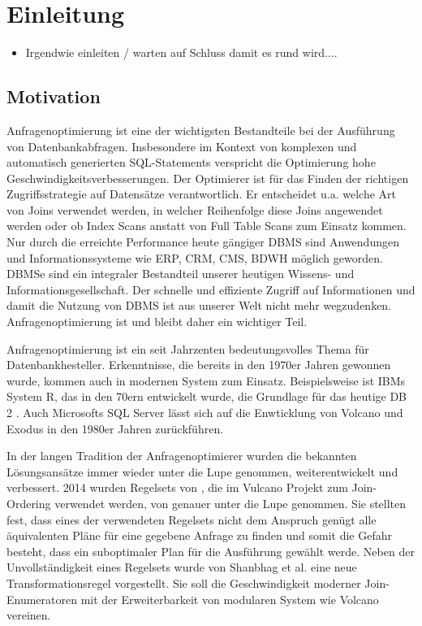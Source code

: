 \chapter{Einleitung}

\begin{itemize}
\item Irgendwie einleiten / warten auf Schluss damit es rund wird....
\end{itemize}



\section{Motivation}


Anfragenoptimierung ist eine der wichtigsten Bestandteile bei der Ausführung von Datenbankabfragen. Insbesondere im Kontext von komplexen und automatisch generierten SQL-Statements verspricht die Optimierung hohe Geschwindigkeitsverbesserungen. Der Optimierer ist für das Finden der richtigen Zugriffsstrategie auf Datensätze verantwortlich. Er entscheidet u.a. welche Art von Joins verwendet werden, in welcher Reihenfolge diese Joins angewendet werden oder ob Index Scans anstatt von Full Table Scans zum Einsatz kommen. Nur durch die erreichte Performance heute gängiger \ac{DBMS} sind Anwendungen und Informationssysteme wie \ac{ERP}, \ac{CRM}, \ac{CMS}, \ac{BDWH} möglich geworden. \ac{DBMS}e sind ein integraler Bestandteil unserer heutigen Wissens- und Informationsgesellschaft. Der schnelle und effiziente Zugriff auf Informationen und damit die Nutzung von \ac{DBMS} ist aus unserer Welt nicht mehr wegzudenken. Anfragenoptimierung ist und bleibt daher ein wichtiger Teil.

Anfragenoptimierung ist ein seit Jahrzenten bedeutungsvolles Thema für Datenbankhesteller. Erkenntnisse, die bereits in den 1970er Jahren gewonnen wurde, kommen auch in modernen System zum Einsatz. Beispielsweise ist IBMs System R, das in den 70ern entwickelt wurde, die Grundlage für das heutige DB 2  \cite{wade2012ibm}. Auch Microsofts SQL Server lässt sich auf die Enwticklung von Volcano und Exodus in den 1980er Jahren zurückführen.

In der langen Tradition der Anfragenoptimierer wurden die bekannten Lösungsansätze immer wieder unter die Lupe genommen, weiterentwickelt und verbessert. 2014 wurden Regelsets von \cite{pellenkoft1997complexity}, die im Vulcano Projekt zum Join-Ordering verwendet werden, von \cite{shanbhag2014optimizing} genauer unter die Lupe genommen. 
Sie stellten fest, dass eines der verwendeten Regelsets nicht dem Anspruch genügt alle äquivalenten Pläne für eine gegebene Anfrage zu finden und somit die Gefahr besteht, dass ein suboptimaler Plan für die Ausführung gewählt werde. Neben der Unvollständigkeit eines Regelsets wurde von Shanbhag et al. eine neue Transformationsregel vorgestellt. Sie soll die Geschwindigkeit moderner Join-Enumeratoren mit der Erweiterbarkeit von modularen System wie Volcano vereinen.

